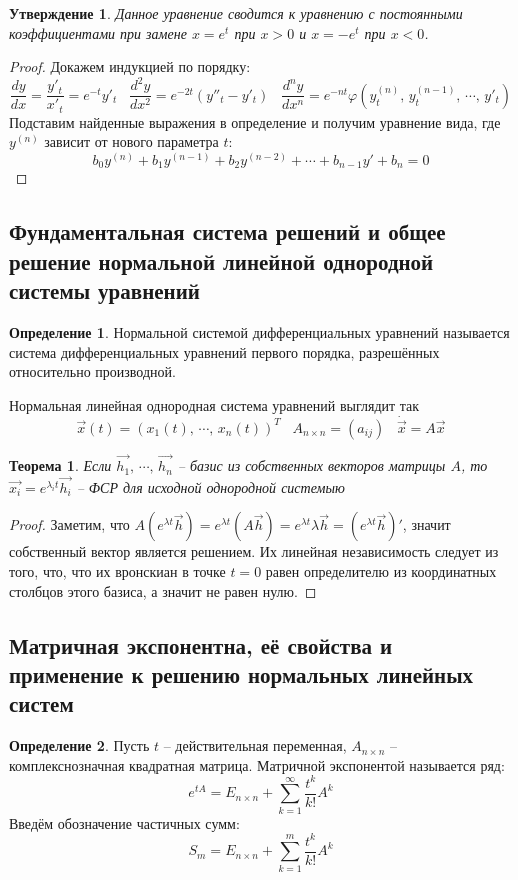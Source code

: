 \documentclass[a4paper,12pt]{article}
\renewcommand{\phi}{\ensuremath{\varphi}}
\theoremstyle{plain}
\newtheorem{theorem}{Теорема}[section]
\newtheorem{proposition}{Утверждение}[section]
\theoremstyle{definition}
\newtheorem{definition}{Определение}[section]
\theoremstyle{remark}
\begin{document}
\begin{proposition}
	Данное уравнение сводится к уравнению с постоянными коэффициентами при замене $x = e^t$ при $x > 0$ и $x = -e^t$ при $x < 0$.
\end{proposition}

\begin{proof}
	Докажем индукцией по порядку:
	\[\frac{dy}{dx} = \frac{y'_t}{x'_t} = e^{-t}y'_t \;\;\; \frac{d^2y}{dx^2} = e^{-2t}(y''_t - y'_t)\;\;\; \frac{d^ny}{dx^n} = e^{-nt}\phi(y^{(n)}_t,\,y^{(n-1)}_t,\,\cdots,\,y'_t)\]
	Подставим найденные выражения в определение и получим уравнение вида, где $y^{(n)}$ зависит от нового параметра $t$:
	\[b_0y^{(n)} + b_1y^{(n-1)} + b_2y^{(n-2)} + \cdots + b_{n-1}y' + b_n = 0\]
\end{proof}

\subsection{Фундаментальная система решений и общее решение нормальной линейной однородной системы уравнений}
\begin{definition}
	Нормальной системой дифференциальных уравнений называется система дифференциальных уравнений первого порядка, разрешённых относительно производной.

	Нормальная линейная однородная система уравнений выглядит так
	\[\vec{x}(t) = (x_1(t),\,\cdots,\,x_n(t))^T\;\;\; A_{n \times n} = (a_{ij}) \;\;\; \dot{\vec{x}} = A\vec{x}\]
\end{definition}

\begin{theorem}
	Если $\vec{h_1},\,\cdots,\,\vec{h_n}$ -- базис из собственных векторов матрицы $A$, то $\vec{x_i} = e^{\lambda_i t}\vec{h_i}$ -- ФСР для исходной однородной системыю
\end{theorem}

\begin{proof}
	Заметим, что $A(e^{\lambda t}\vec{h}) = e^{\lambda t}(A\vec{h}) = e^{\lambda t}\lambda\vec{h} = (e^{\lambda t}\vec{h})'$, значит собственный вектор является решением. Их линейная независимость следует из того, что, что их вронскиан в точке $t = 0$ равен определителю из координатных столбцов этого базиса, а значит не равен нулю.
\end{proof}

\subsection{Матричная экспонентна, её свойства и применение к решению нормальных линейных систем}
\begin{definition}
	Пусть $t$ -- действительная переменная, $A_{n \times n}$ -- комплекснозначная квадратная матрица. Матричной экспонентой называется ряд:
	\[e^{tA} = E_{n \times n} + \sum_{k = 1}^\infty \frac{t^k}{k!}A^k\]
	Введём обозначение частичных сумм:
	\[S_m = E_{n \times n} + \sum_{k = 1}^m \frac{t^k}{k!}A^k\]
\end{definition}
\end{document}
